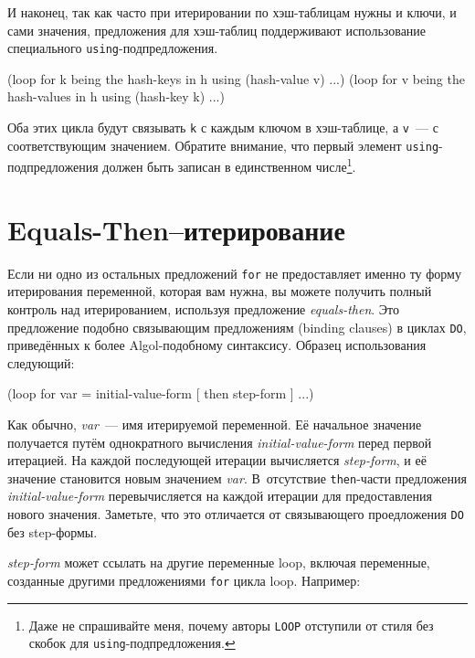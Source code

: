 И наконец, так как часто при итерировании по хэш-таблицам нужны и ключи, и сами значения,
предложения для хэш-таблиц поддерживают использование специального
\lstinline{using}-подпредложения.

\begin{myverb}
(loop for k being the hash-keys in h using (hash-value v) ...)
(loop for v being the hash-values in h using (hash-key k) ...)
\end{myverb}

Оба этих цикла будут связывать \lstinline{k} с каждым ключом в хэш-таблице, а \lstinline{v}~--- с
соответствующим значением. Обратите внимание, что первый элемент
\lstinline{using}-подпредложения должен быть записан в единственном числе\footnote{Даже не
    спрашивайте меня, почему авторы \lstinline{LOOP} отступили от стиля без скобок для
    \lstinline{using}-подпредложения.}\hspace{\footnotenegspace}.

\section{Equals-Then--итерирование}

Если ни одно из остальных предложений \lstinline{for} не предоставляет именно ту форму
итерирования переменной, которая вам нужна, вы можете получить полный контроль над
итерированием, используя предложение \textit{equals-then}. Это предложение подобно
связывающим предложениям (binding clauses) в циклах \lstinline{DO}, приведённых к более
Algol-подобному синтаксису. Образец использования следующий:

\begin{myverb}
(loop for var = initial-value-form [ then step-form ] ...)
\end{myverb}

Как обычно, \textit{var}~--- имя итерируемой переменной. Её начальное значение получается
путём однократного вычисления \textit{initial-value-form} перед первой итерацией. На
каждой последующей итерации вычисляется \textit{step-form}, и её значение становится новым
значением \textit{var}. В~отсутствие \lstinline{then}-части предложения
\textit{initial-value-form} перевычисляется на каждой итерации для предоставления нового
значения. Заметьте, что это отличается от связывающего проедложения \lstinline{DO} без
step-формы.

\textit{step-form} может ссылать на другие переменные loop, включая переменные, созданные
другими предложениями \lstinline{for} цикла loop. Например:

